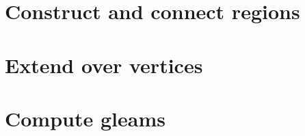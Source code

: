 \label{cha:alg2}


\section{Construct and connect regions}


\section{Extend over vertices}


\section{Compute gleams}

